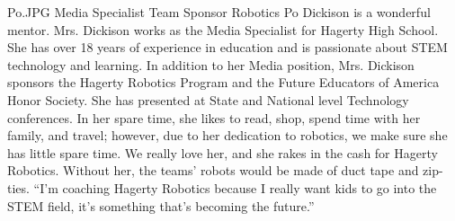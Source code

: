 {Po.JPG}
{Media Specialist}
{Team Sponsor}
{Robotics}
{
Po Dickison is a wonderful mentor. Mrs. Dickison works as the Media Specialist for Hagerty High School. She has over 18 years of experience in education and is passionate about STEM technology and learning. In addition to her Media position, Mrs. Dickison sponsors the Hagerty Robotics Program and the Future Educators of America Honor Society. She has presented at State and National level Technology conferences. In her spare time, she likes to read, shop, spend time with her family, and travel; however, due to her dedication to robotics, we make sure she has little spare time. We really love her, and she rakes in the cash for Hagerty Robotics. Without her, the teams’ robots would be made of duct tape and zip-ties. “I’m coaching Hagerty Robotics because I really want kids to go into the STEM field, it’s something that’s becoming the future.”  \\
}
